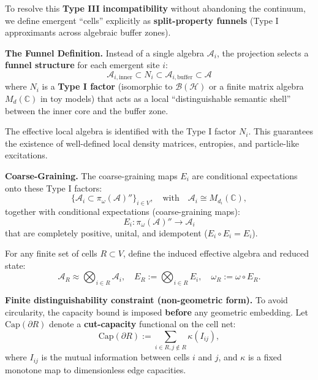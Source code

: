 \documentclass[reprint, amsmath, amssymb, aps, prd]{revtex4-2}
\begin{document}
To resolve this \textbf{Type III incompatibility} without abandoning the continuum, we define emergent ``cells'' explicitly as \textbf{split-property funnels} (Type I approximants across algebraic buffer zones).

\textbf{The Funnel Definition.}
Instead of a single algebra $\mathcal{A}_i$, the projection selects a \textbf{funnel structure} for each emergent site $i$:
\begin{equation}
\mathcal{A}_{i, \text{inner}} \subset N_i \subset \mathcal{A}_{i, \text{buffer}} \subset \mathcal{A}
\end{equation}
where $N_i$ is a \textbf{Type I factor} (isomorphic to $\mathcal{B}(\mathcal{H})$ or a finite matrix algebra $M_d(\mathbb{C})$ in toy models) that acts as a local ``distinguishable semantic shell'' between the inner core and the buffer zone.

The effective local algebra is identified with the Type I factor $N_i$. This guarantees the existence of well-defined local density matrices, entropies, and particle-like excitations.

\textbf{Coarse-Graining.}
The coarse-graining maps $E_i$ are conditional expectations onto these Type I factors:
\begin{equation}
\{\mathcal{A}_i \subset \pi_\omega(\mathcal{A})'' \}_{i \in V}, \quad \text{with} \quad \mathcal{A}_i \cong M_{d_i}(\mathbb{C}),
\end{equation}
together with conditional expectations (coarse-graining maps):
\begin{equation}
E_i : \pi_\omega(\mathcal{A})'' \to \mathcal{A}_i
\end{equation}
that are completely positive, unital, and idempotent ($E_i \circ E_i = E_i$).

For any finite set of cells $R \subset V$, define the induced effective algebra and reduced state:
\begin{equation}
\mathcal{A}_R \approx \bigotimes_{i\in R} \mathcal{A}_i, \quad E_R := \bigotimes_{i\in R} E_i, \quad \omega_R := \omega \circ E_R.
\end{equation}

\textbf{Finite distinguishability constraint (non-geometric form).}
To avoid circularity, the capacity bound is imposed \textbf{before} any geometric embedding. Let $\mathrm{Cap}(\partial R)$ denote a \textbf{cut-capacity} functional on the cell net:
\begin{equation}
\mathrm{Cap}(\partial R) := \sum_{i\in R, j\notin R} \kappa(I_{ij}),
\end{equation}
where $I_{ij}$ is the mutual information between cells $i$ and $j$, and $\kappa$ is a fixed monotone map to dimensionless edge capacities.
\end{document}
